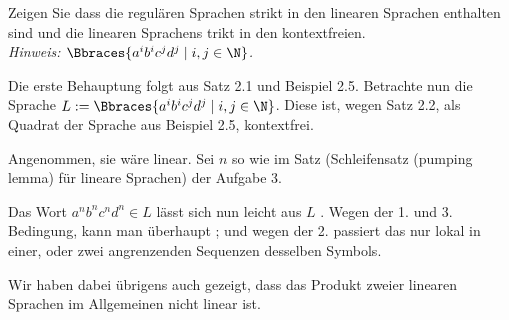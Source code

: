 
\begin{exercise}

Zeigen Sie dass die regulären Sprachen strikt in den linearen Sprachen enthalten sind und die linearen Sprachens trikt in den kontextfreien. \\

\textit{Hinweis: $\Bbraces{a^i b^i c^j d^j \mid i, j \in \N}$.}

\end{exercise}


\begin{solution}

Die erste Behauptung folgt aus Satz 2.1 und Beispiel 2.5.
Betrachte nun die Sprache $L := \Bbraces{a^i b^i c^j d^j \mid i, j \in \N}$.
Diese ist, wegen Satz 2.2, als Quadrat der Sprache aus Beispiel 2.5, kontextfrei.

Angenommen, sie wäre linear.
Sei $n$ so wie im Satz (Schleifensatz (pumping lemma) für lineare Sprachen) der Aufgabe 3.

Das Wort $a^n b^n c^n d^n \in L$ lässt sich nun leicht aus $L$ .
Wegen der 1. und 3. Bedingung, kann man überhaupt ;
und wegen der 2. passiert das nur lokal in einer, oder zwei angrenzenden Sequenzen desselben Symbols.

Wir haben dabei übrigens auch gezeigt, dass das Produkt zweier linearen Sprachen im Allgemeinen nicht linear ist.

\end{solution}

